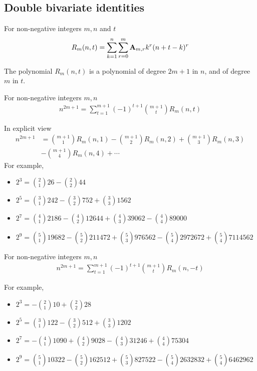 \subsection{Double bivariate identities}
\label{subsec:double-bivariate-identities}
\begin{definition}
    \label{def:double-bivariate-sum-r}
    For non-negative integers $m,n$ and $t$
    \begin{align*}
        R_{m}(n,t) = \sum_{k=1}^{n} \sum_{r=0}^{m} {\mathbf{A}} \sb{m,r} k^r (n+t-k)^r
    \end{align*}
\end{definition}
The polynomial $R_{m}(n,t)$ is a polynomial of degree $2m+1$ in $n$, and of degree $m$ in $t$.
\begin{proposition}
    \label{prop:odd-power-double-bivariate}
    For non-negative integers $m,n$
    \begin{align*}
        n^{2m+1} = \sum_{t=1}^{m+1} (-1)^{t+1} \binom{m+1}{t} R_{m} (n, t)
    \end{align*}
\end{proposition}
In explicit view
\begin{align*}
    n^{2m+1}
    &=  \binom{m+1}{1} R_{m} (n, 1) - \binom{m+1}{2} R_{m} (n, 2) + \binom{m+1}{3} R_{m} (n, 3) \\
    &- \binom{m+1}{4} R_{m} (n, 4) + \cdots
\end{align*}
For example,
\begin{itemize}
    \item $2^3 = \binom{2}{1} 26 - \binom{2}{2} 44$
    \item $2^5 = \binom{3}{1} 242 - \binom{3}{2} 752 + \binom{3}{3} 1562$
    \item $2^7 = \binom{4}{1} 2186 - \binom{4}{2} 12644 + \binom{4}{3} 39062 - \binom{4}{4} 89000$
    \item $2^9 = \binom{5}{1} 19682 - \binom{5}{2} 211472 + \binom{5}{3} 976562 - \binom{5}{4} 2972672 + \binom{5}{4} 7114562$
\end{itemize}
\begin{proposition}
    \label{prop:odd-power-double-bivariate-negated}
    For non-negative integers $m,n$
    \begin{align*}
        n^{2m+1} = \sum_{t=1}^{m+1} (-1)^{t+1} \binom{m+1}{t} R_{m} (n, -t)
    \end{align*}
\end{proposition}
For example,
\begin{itemize}
    \item $2^3 = -\binom{2}{1}10 + \binom{2}{2} 28$
    \item $2^5 = \binom{3}{1} 122 - \binom{3}{2} 512 + \binom{3}{3} 1202$
    \item $2^7 = -\binom{4}{1} 1090 + \binom{4}{2} 9028 - \binom{4}{3} 31246 + \binom{4}{4} 75304$
    \item $2^9 = \binom{5}{1} 10322 - \binom{5}{2} 162512 + \binom{5}{3} 827522 - \binom{5}{4} 2632832 + \binom{5}{4} 6462962$
\end{itemize}
